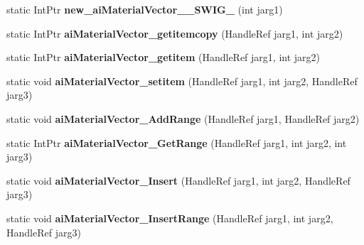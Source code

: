\begin{DoxyCompactItemize}
\item 
\hypertarget{class_assimp_p_i_n_v_o_k_e_a032c7fac2d26e829554067c83acebd63}{static Int\+Ptr {\bfseries new\+\_\+ai\+Material\+Vector\+\_\+\+\_\+\+S\+W\+I\+G\+\_} (int jarg1)}\label{class_assimp_p_i_n_v_o_k_e_a032c7fac2d26e829554067c83acebd63}

\item 
\hypertarget{class_assimp_p_i_n_v_o_k_e_ad4fd3bee39dede7332db18e6f5607f61}{static Int\+Ptr {\bfseries ai\+Material\+Vector\+\_\+getitemcopy} (Handle\+Ref jarg1, int jarg2)}\label{class_assimp_p_i_n_v_o_k_e_ad4fd3bee39dede7332db18e6f5607f61}

\item 
\hypertarget{class_assimp_p_i_n_v_o_k_e_a98f4d8ac4de67c63f3062dd26196c455}{static Int\+Ptr {\bfseries ai\+Material\+Vector\+\_\+getitem} (Handle\+Ref jarg1, int jarg2)}\label{class_assimp_p_i_n_v_o_k_e_a98f4d8ac4de67c63f3062dd26196c455}

\item 
\hypertarget{class_assimp_p_i_n_v_o_k_e_ab5ae9bd309066d8a781748b0b19a99b3}{static void {\bfseries ai\+Material\+Vector\+\_\+setitem} (Handle\+Ref jarg1, int jarg2, Handle\+Ref jarg3)}\label{class_assimp_p_i_n_v_o_k_e_ab5ae9bd309066d8a781748b0b19a99b3}

\item 
\hypertarget{class_assimp_p_i_n_v_o_k_e_a2c7bcf90bf4e3dcc6b8d9e34373bb1f1}{static void {\bfseries ai\+Material\+Vector\+\_\+\+Add\+Range} (Handle\+Ref jarg1, Handle\+Ref jarg2)}\label{class_assimp_p_i_n_v_o_k_e_a2c7bcf90bf4e3dcc6b8d9e34373bb1f1}

\item 
\hypertarget{class_assimp_p_i_n_v_o_k_e_a2f8a40e003bca6eee04e68838ec08241}{static Int\+Ptr {\bfseries ai\+Material\+Vector\+\_\+\+Get\+Range} (Handle\+Ref jarg1, int jarg2, int jarg3)}\label{class_assimp_p_i_n_v_o_k_e_a2f8a40e003bca6eee04e68838ec08241}

\item 
\hypertarget{class_assimp_p_i_n_v_o_k_e_a6ac14eafe00034adf52063516d8d8283}{static void {\bfseries ai\+Material\+Vector\+\_\+\+Insert} (Handle\+Ref jarg1, int jarg2, Handle\+Ref jarg3)}\label{class_assimp_p_i_n_v_o_k_e_a6ac14eafe00034adf52063516d8d8283}

\item 
\hypertarget{class_assimp_p_i_n_v_o_k_e_a65a46da49a8fde076774d79ccdf2422f}{static void {\bfseries ai\+Material\+Vector\+\_\+\+Insert\+Range} (Handle\+Ref jarg1, int jarg2, Handle\+Ref jarg3)}\label{class_assimp_p_i_n_v_o_k_e_a65a46da49a8fde076774d79ccdf2422f}


\end{DoxyCompactItemize}
